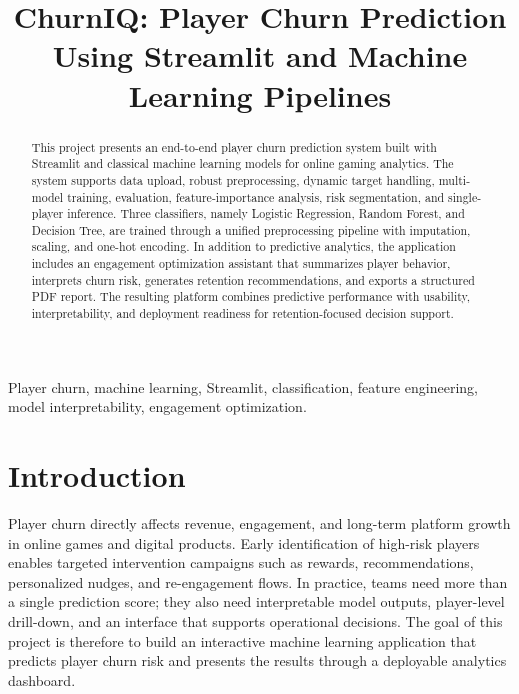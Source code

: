 \documentclass[conference]{IEEEtran}
\begin{document}
\title{ChurnIQ: Player Churn Prediction Using Streamlit and Machine Learning Pipelines}

\author{
}

\maketitle

\begin{abstract}
This project presents an end-to-end player churn prediction system built with Streamlit and classical machine learning models for online gaming analytics. The system supports data upload, robust preprocessing, dynamic target handling, multi-model training, evaluation, feature-importance analysis, risk segmentation, and single-player inference. Three classifiers, namely Logistic Regression, Random Forest, and Decision Tree, are trained through a unified preprocessing pipeline with imputation, scaling, and one-hot encoding. In addition to predictive analytics, the application includes an engagement optimization assistant that summarizes player behavior, interprets churn risk, generates retention recommendations, and exports a structured PDF report. The resulting platform combines predictive performance with usability, interpretability, and deployment readiness for retention-focused decision support.
\end{abstract}

\begin{IEEEkeywords}
Player churn, machine learning, Streamlit, classification, feature engineering, model interpretability, engagement optimization.
\end{IEEEkeywords}

\section{Introduction}
Player churn directly affects revenue, engagement, and long-term platform growth in online games and digital products. Early identification of high-risk players enables targeted intervention campaigns such as rewards, recommendations, personalized nudges, and re-engagement flows. In practice, teams need more than a single prediction score; they also need interpretable model outputs, player-level drill-down, and an interface that supports operational decisions. The goal of this project is therefore to build an interactive machine learning application that predicts player churn risk and presents the results through a deployable analytics dashboard.
\end{document}
